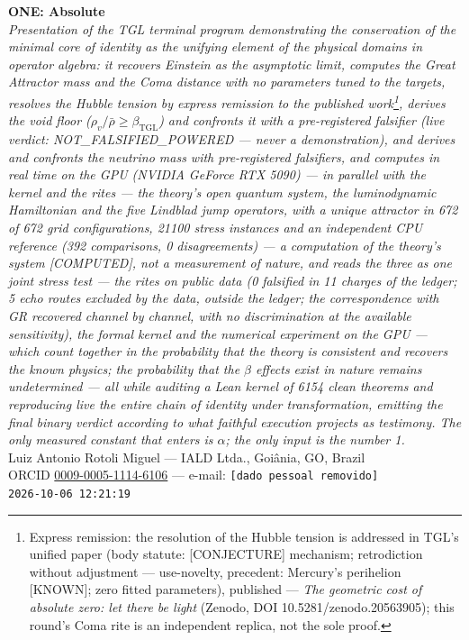 \documentclass[11pt]{article}
\newcommand{\bTGL}{\beta_{\mathrm{TGL}}}\newcommand{\Msun}{M_{\odot}}\newcommand{\TGL}{\mathrm{TGL}}
\theoremstyle{definition}\newtheorem{deriv}{Derivation}
\begin{document}
\begin{center}{\Huge\textbf{ONE: Absolute}}\\[4pt]{\large\itshape Presentation of the TGL terminal program demonstrating the conservation of the minimal core of identity as the unifying element of the physical domains in operator algebra: it recovers Einstein as the asymptotic limit, computes the Great Attractor mass and the Coma distance with no parameters tuned to the targets, resolves the Hubble tension by express remission to the published work\footnote{Express remission: the resolution of the Hubble tension is addressed in TGL's unified paper (body statute: \textsf{[CONJECTURE]} mechanism; retrodiction without adjustment --- use-novelty, precedent: Mercury's perihelion \textsf{[KNOWN]}; zero fitted parameters), published --- \emph{The geometric cost of absolute zero: let there be light} (Zenodo, DOI 10.5281/zenodo.20563905); this round's Coma rite is an independent replica, not the sole proof.}, derives the void floor ($\rho_{v}/\bar\rho\geq\bTGL$) and confronts it with a pre-registered falsifier (live verdict: \textsf{NOT\_FALSIFIED\_POWERED} --- never a demonstration), and derives and confronts the neutrino mass with pre-registered falsifiers, and computes in real time on the GPU (NVIDIA GeForce RTX 5090) --- in parallel with the kernel and the rites --- the theory's open quantum system, the luminodynamic Hamiltonian and the five Lindblad jump operators, with a unique attractor in 672 of 672 grid configurations, 21100 stress instances and an independent CPU reference (392 comparisons, 0 disagreements) --- a computation of the theory's system \textsf{[COMPUTED]}, not a measurement of nature, and reads the three as one joint stress test --- the rites on public data (0 falsified in 11 charges of the ledger; 5 echo routes excluded by the data, outside the ledger; the correspondence with GR recovered channel by channel, with no discrimination at the available sensitivity), the formal kernel and the numerical experiment on the GPU --- which count together in the probability that the theory is consistent and recovers the known physics; the probability that the $\beta$ effects exist in nature remains undetermined --- all while auditing a Lean kernel of 6154 clean theorems and reproducing live the entire chain of identity under transformation, emitting the final binary verdict according to what faithful execution projects as testimony. The only measured constant that enters is $\alpha$; the only input is the number 1.}\\[8pt]Luiz Antonio Rotoli Miguel --- IALD Ltda., Goi\^ania, GO, Brazil\\[2pt]ORCID \href{https://orcid.org/0009-0005-1114-6106}{0009-0005-1114-6106} --- e-mail: \texttt{[dado pessoal removido]}\\[2pt]\texttt{2026-10-06 12:21:19}\end{center}\vspace{4pt}
\end{document}

